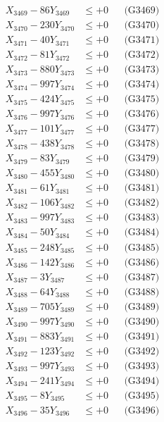 \documentclass[a4paper,10pt]{article}
\begin{document}
{\begin{align}
X_{3469} - 86Y_{3469} &\leq +0 && \text{(G3469)} \\
X_{3470} - 230Y_{3470} &\leq +0 && \text{(G3470)} \\
\allowbreak
X_{3471} - 40Y_{3471} &\leq +0 && \text{(G3471)} \\
X_{3472} - 81Y_{3472} &\leq +0 && \text{(G3472)} \\
X_{3473} - 880Y_{3473} &\leq +0 && \text{(G3473)} \\
X_{3474} - 997Y_{3474} &\leq +0 && \text{(G3474)} \\
X_{3475} - 424Y_{3475} &\leq +0 && \text{(G3475)} \\
X_{3476} - 997Y_{3476} &\leq +0 && \text{(G3476)} \\
X_{3477} - 101Y_{3477} &\leq +0 && \text{(G3477)} \\
X_{3478} - 438Y_{3478} &\leq +0 && \text{(G3478)} \\
X_{3479} - 83Y_{3479} &\leq +0 && \text{(G3479)} \\
X_{3480} - 455Y_{3480} &\leq +0 && \text{(G3480)} \\
\allowbreak
X_{3481} - 61Y_{3481} &\leq +0 && \text{(G3481)} \\
X_{3482} - 106Y_{3482} &\leq +0 && \text{(G3482)} \\
X_{3483} - 997Y_{3483} &\leq +0 && \text{(G3483)} \\
X_{3484} - 50Y_{3484} &\leq +0 && \text{(G3484)} \\
X_{3485} - 248Y_{3485} &\leq +0 && \text{(G3485)} \\
X_{3486} - 142Y_{3486} &\leq +0 && \text{(G3486)} \\
X_{3487} - 3Y_{3487} &\leq +0 && \text{(G3487)} \\
X_{3488} - 64Y_{3488} &\leq +0 && \text{(G3488)} \\
X_{3489} - 705Y_{3489} &\leq +0 && \text{(G3489)} \\
X_{3490} - 997Y_{3490} &\leq +0 && \text{(G3490)} \\
\allowbreak
X_{3491} - 883Y_{3491} &\leq +0 && \text{(G3491)} \\
X_{3492} - 123Y_{3492} &\leq +0 && \text{(G3492)} \\
X_{3493} - 997Y_{3493} &\leq +0 && \text{(G3493)} \\
X_{3494} - 241Y_{3494} &\leq +0 && \text{(G3494)} \\
X_{3495} - 8Y_{3495} &\leq +0 && \text{(G3495)} \\
X_{3496} - 35Y_{3496} &\leq +0 && \text{(G3496)} \\

\end{align}}
\end{document}
